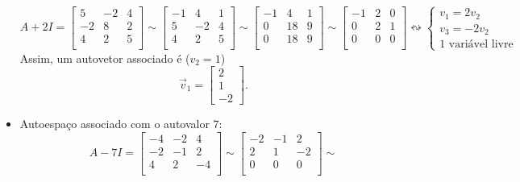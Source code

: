 \begin{ex}
\begin{itemize}
\begin{equation}
		A + 2 I =
		\begin{bmatrix}
		5 & -2 & 4 \\
		-2 & 8 & 2 \\
		4 & 2 & 5 \\
		\end{bmatrix} \sim
		\begin{bmatrix}
		-1 & 4 & 1 \\
		5 & -2 & 4 \\
		4 & 2 & 5 \\
		\end{bmatrix} \sim
		\begin{bmatrix}
		-1 & 4 & 1 \\
		0 & 18 & 9 \\
		0 & 18 & 9 \\
		\end{bmatrix} \sim
		\begin{bmatrix}
		-1 & 2 & 0 \\
		0 &  2 & 1 \\
		0 &  0 & 0 \\
		\end{bmatrix} \leftrightsquigarrow
		\left\lbrace
		\begin{array}{l}
		v_1 = 2 v_2 \\
		v_3 = - 2 v_2 \\
		\text{1 variável livre}
		\end{array}
		\right.
		\end{equation} Assim, um autovetor associado é ($v_2 = 1$)
		\begin{equation}
		\vec{v}_1 =
		\begin{bmatrix}
		2 \\ 1 \\ -2
		\end{bmatrix}.
		\end{equation}
		\item Autoespaço associado com o autovalor $7$:
		\begin{equation}
		A - 7 I =
		\begin{bmatrix}
		-4 & -2 & 4 \\
		-2 & -1 & 2 \\
		4 & 2 & -4 \\
		\end{bmatrix} \sim
		\begin{bmatrix}
		-2 & -1 & 2 \\
		2 & 1 & -2 \\
		0 & 0 & 0 \\
		\end{bmatrix} \sim

\end{equation}
\end{itemize}
\end{ex}
